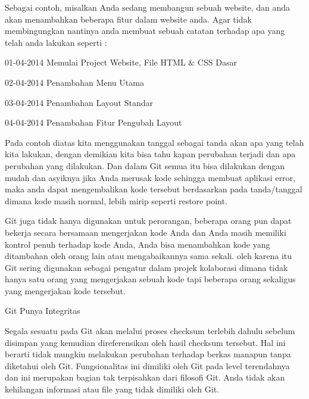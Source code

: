 \vspace{\baselineskip}
\noindent 
Sebagai contoh, misalkan Anda sedang membangun sebuah website, dan anda akan menambahkan beberapa fitur dalam website anda. Agar tidak membingungkan nantinya anda membuat sebuah catatan terhadap apa yang telah anda lakukan seperti : \par
\noindent 
 \hspace*{0.5in} 01-04-2014 Memulai Project Website, File HTML  $  \&  $ CSS Dasar \par
\noindent 
 \hspace*{0.5in} 02-04-2014 Penambahan Menu Utama \par
\noindent 
 \hspace*{0.5in} 03-04-2014 Penambahan Layout Standar \par
\noindent 
 \hspace*{0.5in} 04-04-2014 Penambahan Fitur Pengubah Layout \par
 \vspace{\baselineskip}
\noindent 
 \hspace*{0.5in} Pada contoh diatas kita menggunakan tanggal sebagai tanda akan apa yang telah kita lakukan, dengan demikian kita bisa tahu kapan perubahan terjadi dan apa perubahan yang dilakukan. Dan dalam Git semua itu bisa dilakukan dengan mudah dan asyiknya jika Anda merusak kode sehingga membuat aplikasi error, maka anda dapat mengembalikan kode tersebut berdasarkan pada tanda/tanggal dimana kode masih normal, lebih mirip seperti restore point. \par
 \vspace{\baselineskip}
\noindent 
 \hspace*{0.5in} Git juga tidak hanya digunakan untuk perorangan, beberapa orang pun dapat bekerja secara bersamaan mengerjakan kode Anda dan Anda masih memiliki kontrol penuh terhadap kode Anda, Anda bisa menambahkan kode yang ditambahan oleh orang lain atau mengabaikannya sama sekali. oleh karena itu Git sering digunakan sebagai pengatur dalam projek kolaborasi dimana tidak hanya satu orang yang mengerjakan sebuah kode tapi beberapa orang sekaligus yang mengerjakan kode tersebut. \par
 \vspace{\baselineskip}
\noindent 
 \hspace*{0.5in} Git Punya Integritas \par
\noindent 
Segala sesuatu pada Git akan melalui proses checksum terlebih dahulu sebelum disimpan yang kemudian direferensikan oleh hasil checksum tersebut. Hal ini berarti tidak mungkin melakukan perubahan terhadap berkas manapun tanpa diketahui oleh Git. Fungsionalitas ini dimiliki oleh Git pada level terendahnya dan ini merupakan bagian tak terpisahkan dari filosofi Git. Anda tidak akan kehilangan informasi atau file yang tidak dimiliki oleh Git. \par
